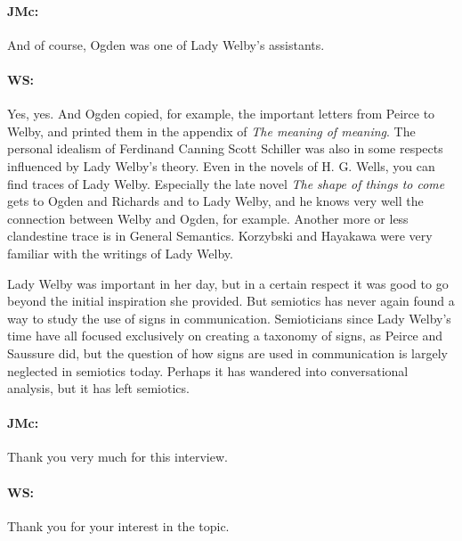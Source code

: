 \documentclass[output=paper]{langscibook}
\begin{document}
\paragraph*{JMc:} And of course, Ogden was one of Lady Welby’s assistants.

\paragraph*{WS:} Yes, yes. And Ogden copied, for example, the important letters from Peirce to Welby, and printed them in the appendix of \textit{The meaning of meaning}. The personal idealism of Ferdinand Canning Scott Schiller was also in some respects influenced by Lady Welby’s theory. Even in the novels of H. G. Wells, you can find traces of Lady Welby. Especially the late novel \textit{The shape of things to come} gets to Ogden and Richards and to Lady Welby, and he knows very well the connection between Welby and Ogden, for example. Another more or less clandestine trace is in General Semantics. Korzybski and Hayakawa were very familiar with the writings of Lady Welby.

Lady Welby was important in her day, but in a certain respect it was good to go beyond the initial inspiration she provided. But semiotics has never again found a way to study the use of signs in communication. Semioticians since Lady Welby’s time have all focused exclusively on creating a taxonomy of signs, as Peirce and Saussure did, but the question of how signs are used in communication is largely neglected in semiotics today. Perhaps it has wandered into conversational analysis, but it has left semiotics.

\paragraph*{JMc:} Thank you very much for this interview.

\paragraph*{WS:} Thank you for your interest in the topic.


\nocite{hayakawa1939a}
\nocite{ogden1949a}
\nocite{russell1905a}
\nocite{schiller1920a}
\nocite{strawson1950a}
\nocite{welby1883a}
\nocite{welby1897a}
\nocite{welby1983a}
\nocite{welby1985a}
\nocite{welby1985b}
\nocite{welby1985c}
\nocite{welby1902a}
\nocite{wells1933a}
\nocite{heijerman1991a}
\nocite{mcelvenny2014a}
\nocite{mcelvenny2018a}
\nocite{petrilli2009a}
\nocite{petrilli2015a}
\nocite{schmitz1985a}
\nocite{schmitz1990a}
\nocite{schmitz1990b}
\nocite{schmitz1993a}
\nocite{schmitz1995a}
\nocite{schmitz1998a}
\nocite{schmitz2009a}
\nocite{schmitz2011a}
\nocite{schmitz2014a}
\nocite{unknown2013a}


\sloppy
\PrintPrimarySources{}
\PrintSecondarySources{}
\end{document}
